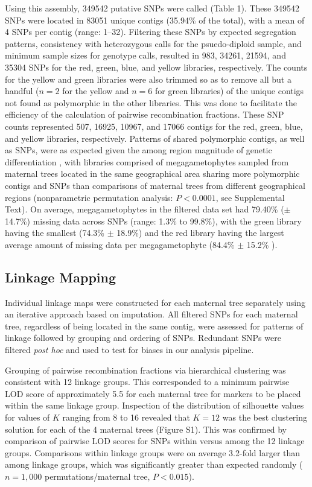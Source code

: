 \documentclass[smallextended]{svjour3}
\begin{document}
Using this assembly, \num{349542} putative SNPs were called (Table 1). These
\num{349542} SNPs were located in \num{83051} unique contigs (35.94\% of the
total), with a mean of \num{4} SNPs per contig (range:
\SIrange{1}{32}{}). Filtering these SNPs by expected segregation patterns,
consistency with heterozygous calls for the psuedo-diploid sample, and minimum
sample sizes for genotype calls, resulted in \num{983}, \num{34261},
\num{21594}, and \num{35304} SNPs for the red, green, blue, and yellow
libraries, respectively. The counts for the yellow and green libraries were also
trimmed so as to remove all but a handful ($n = 2$ for the yellow and $n = 6$
for green libraries) of the unique contigs not found as polymorphic in the other
libraries. This was done to facilitate the efficiency of the calculation of
pairwise recombination fractions. These SNP counts represented \num{507},
\num{16925}, \num{10967}, and \num{17066} contigs for the red, green, blue, and
yellow libraries, respectively. Patterns of shared polymorphic contigs, as well
as SNPs, were as expected given the among region magnitude of genetic
differentiation \citep[Figure 2, see][]{Eckert:2008}, with libraries comprised
of megagametophytes sampled from maternal trees located in the same geographical
area sharing more polymorphic contigs and SNPs than comparisons of maternal
trees from different geographical regions (nonparametric permutation analysis:
$P < 0.0001$, see Supplemental Text).  On average, megagametophytes in the
filtered data set had 79.40\% ($\pm$ 14.7\%) missing data across SNPs (range:
1.3\% to 99.8\%), with the green library having the smallest (74.3\% $\pm$
18.9\%) and the red library having the largest average amount of missing data
per megagametophyte (84.4\% $\pm$ 15.2\% ).

\subsection*{Linkage Mapping}

Individual linkage maps were constructed for each maternal tree separately using
an iterative approach based on imputation. All filtered SNPs for each maternal
tree, regardless of being located in the same contig, were assessed for patterns
of linkage followed by grouping and ordering of SNPs. Redundant SNPs were
filtered \textit{post hoc} and used to test for biases in our analysis pipeline.

Grouping of pairwise recombination fractions via hierarchical clustering was
consistent with \num{12} linkage groups.  This corresponded to a minimum
pairwise LOD score of approximately 5.5 for each maternal tree for markers to be
placed within the same linkage group.  Inspection of the distribution of
silhouette values for values of $K$ ranging from \num{8} to \num{16} revealed
that $K = 12$ was the best clustering solution for each of the \num{4} maternal
trees (Figure S1). This was confirmed by comparison of pairwise LOD scores for
SNPs within versus among the \num{12} linkage groups. Comparisons within linkage
groups were on average 3.2-fold larger than among linkage groups, which was
significantly greater than expected randomly ($n = 1,000$ permutations/maternal
tree, $P < 0.015$).
\end{document}
